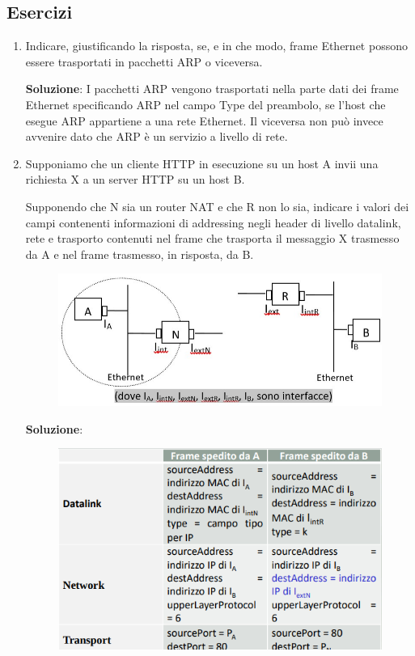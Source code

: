 \documentclass[11pt,a4paper,oneside]{book}
\theoremstyle{definition}
\begin{document}
\subsection{Esercizi}

\begin{enumerate}
	\item Indicare, giustificando la risposta, se, e in che modo, frame Ethernet possono essere trasportati in pacchetti ARP o viceversa.

	      \textbf{Soluzione}:
	      I pacchetti ARP vengono trasportati nella parte dati dei frame Ethernet specificando ARP nel campo Type del preambolo, se l’host che esegue ARP appartiene a una rete Ethernet. Il viceversa non può invece avvenire dato che ARP è un servizio a livello di rete.

	\item Supponiamo che un cliente HTTP in esecuzione su un host A invii una
	      richiesta X a un server HTTP su un host B.

	      Supponendo che N sia un router
	      NAT e che R non lo sia, indicare i valori dei campi contenenti informazioni
	      di addressing negli header di livello datalink, rete e trasporto contenuti nel
	      frame che trasporta il messaggio X trasmesso da A e nel frame trasmesso,
	      in risposta, da B.

	      \pagebreak

	      \begin{figure}[!h]
		      \includegraphics[scale=0.4]{Immagini/Eser.png}
		      \centering
	      \end{figure}

	      \textbf{Soluzione}:

	      \begin{figure}[!h]
		      \includegraphics[scale=0.4]{Immagini/Eser_sol.png}
		      \centering
	      \end{figure}


\end{enumerate}
\end{document}
